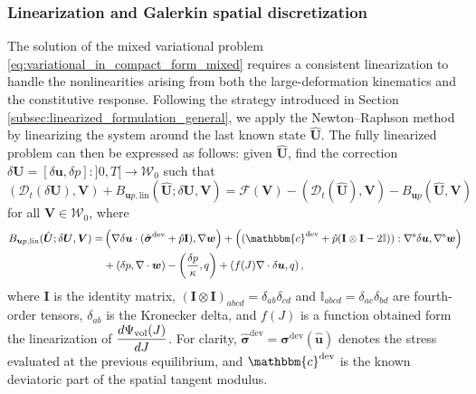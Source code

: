 \documentclass[11pt,english]{article}
\def\disp{\boldsymbol{u}}
\def\disptest{\boldsymbol{w}}
\def\stress{\boldsymbol{\sigma}}
\def\Identity{\mathbf{I}}
\def\SpaceTotal{\boldsymbol{\mathcal{W}}}
\def\TestFunctions{\boldsymbol{V}}
\def\UnkVariables{\boldsymbol{U}}
\def\VolPsi{\Psi_{\rm{vol}}}
\def\DerBmixedLIN{B_{\disp p, \text{lin}}}
\def\Bmixed{B_{\disp p}}
\begin{document}
\subsubsection{Linearization and Galerkin spatial discretization} \label{sec:linearization_mixed}
    The solution of the mixed variational problem \eqref{eq:variational_in_compact_form_mixed} requires a consistent linearization to handle the nonlinearities arising from both the large-deformation kinematics and the constitutive response. Following the strategy introduced in Section \ref{subsec:linearized_formulation_general}, we apply the Newton--Raphson method by linearizing the system around the last known state $\hat{\UnkVariables}$. 
    The fully linearized problem can then be expressed as follows: given  $\hat{\UnkVariables}$, find the correction 
    $\delta \UnkVariables=[\delta \disp, \delta p]:]0,T[\longrightarrow\SpaceTotal_0$ such that
    \begin{equation}
        \left(\mathcal{D}_t\left( \delta \UnkVariables \right),\TestFunctions \right )+ \DerBmixedLIN (\hat{\UnkVariables};\delta \UnkVariables,\TestFunctions) 
        = \mathcal{F}\left(\TestFunctions\right)-(\mathcal{D}_t(\hat{\UnkVariables}),\TestFunctions ) -\Bmixed(\hat{\UnkVariables},\TestFunctions) 
        \label{eq:linearization_mixed}
    \end{equation}
    for all $\TestFunctions \in \SpaceTotal_0$, where
    \begin{align*}
        \DerBmixedLIN(\hat{\UnkVariables}; \delta \UnkVariables, \TestFunctions)=& 
        \left( \nabla \delta \disp \cdot (\hat{\stress}^{\text{dev}}+\hat{p}\Identity), \nabla \disptest \right) 
        + \left(  (\mathbbm{c}^{\text{dev}}+\hat{p}(\Identity \otimes \Identity -2\mathbb{I})):\nabla^{\rm{s}} \delta \disp, \nabla^{\rm{s}} \disptest \right) \\
        &+\left( \delta p ,\nabla \cdot \disptest \right) - \left( \dfrac{\delta p}{\kappa}, q\right) + \left( f(J) \nabla \cdot \delta \disp, q\right),
    \end{align*}
    where $\Identity$ is the identity matrix, $(\Identity \otimes \Identity)_{abcd}=\delta_{ab}\delta_{cd}$ and $\mathbb{I}_{abcd}=\delta_{ac}\delta_{bd}$ are fourth-order tensors, $\delta_{ab}$ is the Kronecker delta, and $f(J)$ is a function obtained form the linearization of $\dfrac{d\VolPsi(J)}{dJ}$.
    For clarity, $\hat{\stress}^{\text{dev}}=\stress^{\text{dev}}(\hat{\boldsymbol{u}})$ denotes the stress evaluated at the previous equilibrium, 
    and $\mathbbm{c}^{\text{dev}}$ is the known deviatoric part of the spatial tangent modulus. 
    
\end{document}
